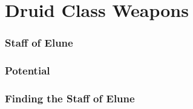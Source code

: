 \section{Druid Class Weapons}

\subsubsection{Staff of Elune}



\subsubsection{Potential}



\subsubsection{Finding the Staff of Elune}